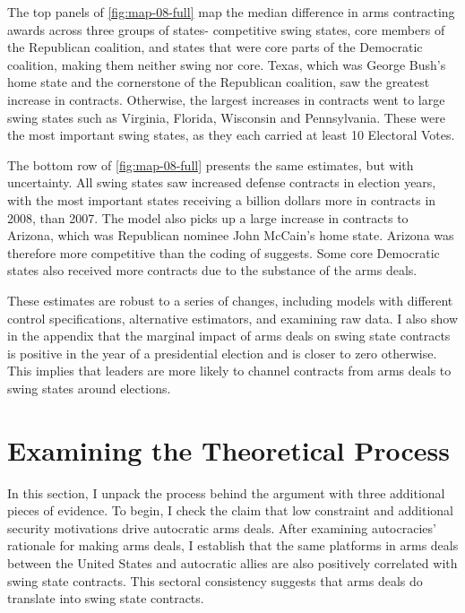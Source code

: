 \documentclass[12pt]{article}
\begin{document}
The top panels of \autoref{fig:map-08-full} map the median difference in arms contracting awards across three groups of states- competitive swing states, core members of the Republican coalition, and states that were core parts of the Democratic coalition, making them neither swing nor core. 
Texas, which was George Bush's home state and the cornerstone of the Republican coalition, saw the greatest increase in contracts.
Otherwise, the largest increases in contracts went to large swing states such as Virginia, Florida, Wisconsin and Pennsylvania. 
These were the most important swing states, as they each carried at least 10 Electoral Votes. 


The bottom row of \autoref{fig:map-08-full} presents the same estimates, but with uncertainty. 
All swing states saw increased defense contracts in election years, with the most important states receiving a billion dollars more in contracts in 2008, than 2007.
The model also picks up a large increase in contracts to Arizona, which was Republican nominee John McCain's home state.
Arizona was therefore more competitive than the coding of \citet{KrinerReeves2015} suggests. 
Some core Democratic states also received more contracts due to the substance of the arms deals. 


These estimates are robust to a series of changes, including models with different control specifications, alternative estimators, and examining raw data.
I also show in the appendix that the marginal impact of arms deals on swing state contracts is positive in the year of a presidential election and is closer to zero otherwise.
This implies that leaders are more likely to channel contracts from arms deals to swing states around elections. 


\section{Examining the Theoretical Process}


In this section, I unpack the process behind the argument with three additional pieces of evidence.  
To begin, I check the claim that low constraint and additional security motivations drive autocratic arms deals.
After examining autocracies' rationale for making arms deals, I establish that the same platforms in arms deals between the United States and autocratic allies are also positively correlated with swing state contracts.
This sectoral consistency suggests that arms deals do translate into swing state contracts.
\end{document}
